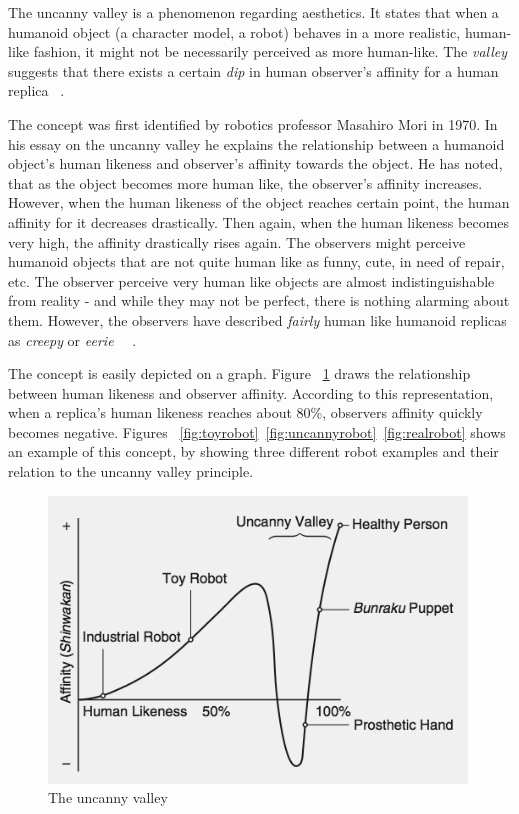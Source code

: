 The uncanny valley is a phenomenon regarding aesthetics. It states that when a humanoid object (a character model, a robot) behaves in a more realistic, human-like fashion, it might not be necessarily perceived as more human-like. The \textit{valley} suggests that there exists a certain \textit{dip} in human observer's affinity for a human replica ~\cite{uncanny1}.

The concept was first identified by robotics professor Masahiro Mori in 1970. In his essay on the uncanny valley he explains the relationship between a humanoid object's human likeness and observer's affinity towards the object. He has noted, that as the object becomes more human like, the observer's affinity increases. However, when the human likeness of the object reaches certain point, the human affinity for it decreases drastically. Then again, when the human likeness becomes very high, the affinity drastically rises again. The observers might perceive humanoid objects that are not quite human like as funny, cute, in need of repair, etc. The observer perceive very human like objects are almost indistinguishable from reality - and while they may not be perfect, there is nothing alarming about them. However, the observers have described \textit{fairly} human like humanoid replicas as \textit{creepy} or \textit{eerie} ~\cite{uncanny1}~\cite{uncanny2}.

The concept is easily depicted on a graph. Figure ~\ref{fig:uncanny} draws the relationship between human likeness and observer affinity. According to this representation, when a replica's human likeness reaches about 80\%, observers affinity quickly becomes negative. Figures ~\ref{fig:toyrobot}~\ref{fig:uncannyrobot}~\ref{fig:realrobot} shows an example of this concept, by showing three different robot examples and their relation to the uncanny valley principle. 

\begin{figure}[H]
\centerline{\includegraphics[width = 30em,scale=0.25]{img/uncanny.png}}
\caption{The uncanny valley}\label{fig:uncanny}
\end{figure}

